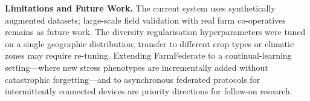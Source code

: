 \documentclass[conference]{IEEEtran}
\begin{document}
\textbf{Limitations and Future Work.} The current system uses synthetically augmented
datasets; large-scale field validation with real farm co-operatives remains as future
work. The diversity regularisation hyperparameters were tuned on a single geographic
distribution; transfer to different crop types or climatic zones may require re-tuning.
Extending FarmFederate to a continual-learning setting---where new stress phenotypes
are incrementally added without catastrophic forgetting---and to asynchronous federated
protocols for intermittently connected devices are priority directions for follow-on research.


\FloatBarrier

\end{document}
